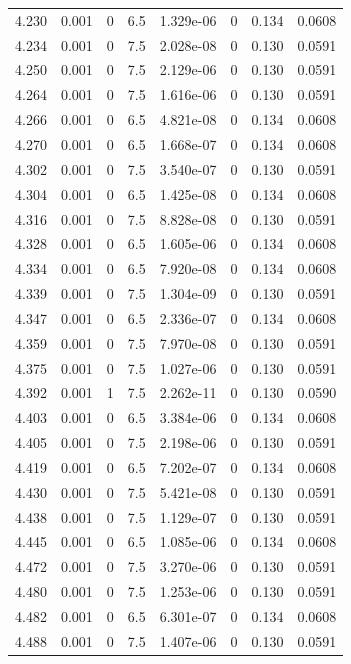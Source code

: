 \documentclass[preview]{standalone}
\begin{document}
{{{{{{{{{{{{\begin{tabular}{L{1.2cm}C{1.2cm} C{0.3cm}C{0.5cm} C{1.4cm}C{1.4cm} C{1.4cm}C{1.4cm}}
  4.230  &  0.001  & 0     & 6.5 &  1.329e-06  & 0  & 0.134 &  0.0608   \\ 
  4.234  &  0.001  & 0     & 7.5 &  2.028e-08  & 0  & 0.130 &  0.0591   \\ 
  4.250  &  0.001  & 0     & 7.5 &  2.129e-06  & 0  & 0.130 &  0.0591   \\ 
  4.264  &  0.001  & 0     & 7.5 &  1.616e-06  & 0  & 0.130 &  0.0591   \\ 
  4.266  &  0.001  & 0     & 6.5 &  4.821e-08  & 0  & 0.134 &  0.0608   \\ 
  4.270  &  0.001  & 0     & 6.5 &  1.668e-07  & 0  & 0.134 &  0.0608   \\ 
  4.302  &  0.001  & 0     & 7.5 &  3.540e-07  & 0  & 0.130 &  0.0591   \\ 
  4.304  &  0.001  & 0     & 6.5 &  1.425e-08  & 0  & 0.134 &  0.0608   \\ 
  4.316  &  0.001  & 0     & 7.5 &  8.828e-08  & 0  & 0.130 &  0.0591   \\ 
  4.328  &  0.001  & 0     & 6.5 &  1.605e-06  & 0  & 0.134 &  0.0608   \\ 
  4.334  &  0.001  & 0     & 6.5 &  7.920e-08  & 0  & 0.134 &  0.0608   \\ 
  4.339  &  0.001  & 0     & 7.5 &  1.304e-09  & 0  & 0.130 &  0.0591   \\ 
  4.347  &  0.001  & 0     & 6.5 &  2.336e-07  & 0  & 0.134 &  0.0608   \\ 
  4.359  &  0.001  & 0     & 7.5 &  7.970e-08  & 0  & 0.130 &  0.0591   \\ 
  4.375  &  0.001  & 0     & 7.5 &  1.027e-06  & 0  & 0.130 &  0.0591   \\ 
  4.392  &  0.001  & 1     & 7.5 &  2.262e-11  & 0  & 0.130 &  0.0590   \\ 
  4.403  &  0.001  & 0     & 6.5 &  3.384e-06  & 0  & 0.134 &  0.0608   \\ 
  4.405  &  0.001  & 0     & 7.5 &  2.198e-06  & 0  & 0.130 &  0.0591   \\ 
  4.419  &  0.001  & 0     & 6.5 &  7.202e-07  & 0  & 0.134 &  0.0608   \\ 
  4.430  &  0.001  & 0     & 7.5 &  5.421e-08  & 0  & 0.130 &  0.0591   \\ 
  4.438  &  0.001  & 0     & 7.5 &  1.129e-07  & 0  & 0.130 &  0.0591   \\ 
  4.445  &  0.001  & 0     & 6.5 &  1.085e-06  & 0  & 0.134 &  0.0608   \\ 
  4.472  &  0.001  & 0     & 7.5 &  3.270e-06  & 0  & 0.130 &  0.0591   \\ 
  4.480  &  0.001  & 0     & 7.5 &  1.253e-06  & 0  & 0.130 &  0.0591   \\ 
  4.482  &  0.001  & 0     & 6.5 &  6.301e-07  & 0  & 0.134 &  0.0608   \\ 
  4.488  &  0.001  & 0     & 7.5 &  1.407e-06  & 0  & 0.130 &  0.0591   \\ 
\hline 
\end{tabular} 

}}}}}}}}}}}}
\end{document}
